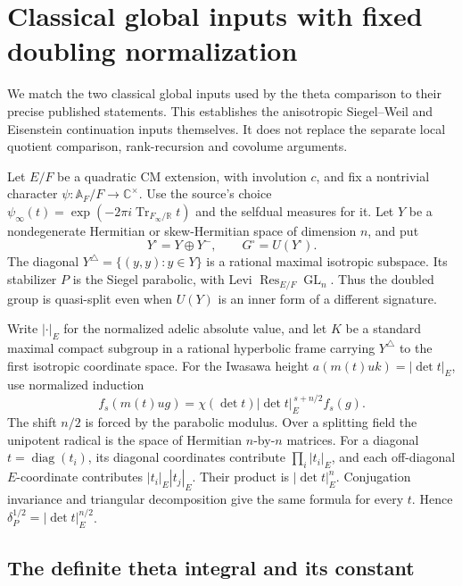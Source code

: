 \section{Classical global inputs with fixed doubling normalization}
\label{sec:sr-classical-doubling-inputs}

We match the two classical global inputs used by the theta
comparison to their precise published statements.
This establishes the anisotropic Siegel--Weil and Eisenstein
continuation inputs themselves.
It does not replace the separate local quotient comparison,
rank-recursion and covolume arguments.

Let \(E/F\) be a quadratic CM extension, with involution
\(c\), and fix a nontrivial character
\(\psi:\mathbb A_F/F\to\mathbb C^\times\).
Use the source's choice
\(\psi_\infty(t)=\exp(-2\pi i\operatorname{Tr}_{F_\infty/\mathbb R}t)\)
and the selfdual measures for it.
Let \(Y\) be a nondegenerate Hermitian or skew-Hermitian
space of dimension \(n\), and put
\[
             Y^\square=Y\oplus Y^{-},\qquad
             G^\square=U(Y^\square).
\]
The diagonal \(Y^\triangle=\{(y,y):y\in Y\}\) is a rational
maximal isotropic subspace.
Its stabilizer \(P\) is the Siegel parabolic, with Levi
\(\operatorname{Res}_{E/F}\operatorname{GL}_n\).
Thus the doubled group is quasi-split even when \(U(Y)\)
is an inner form of a different signature.

Write \(|\cdot|_E\) for the normalized adelic absolute value,
and let \(K\) be a standard maximal compact subgroup in
a rational hyperbolic frame carrying \(Y^\triangle\) to the
first isotropic coordinate space.
For the Iwasawa height
\(a(m(t)uk)=|\det t|_E\), use normalized induction
\begin{equation}\label{eq:sr-exact-induced-section}
 f_s(m(t)ug)
       =\chi(\det t)|\det t|_E^{\,s+n/2}f_s(g).
\end{equation}
The shift \(n/2\) is forced by the parabolic modulus.
Over a splitting field the unipotent radical is the space of
Hermitian \(n\)-by-\(n\) matrices.
For a diagonal \(t=\operatorname{diag}(t_i)\), its diagonal
coordinates contribute \(\prod_i|t_i|_E\), and each
off-diagonal \(E\)-coordinate contributes
\(|t_i|_E|t_j|_E\).
Their product is \(|\det t|_E^n\).
Conjugation invariance and triangular decomposition give the
same formula for every \(t\).
Hence \(\delta_P^{1/2}=|\det t|_E^{n/2}\).

\subsection{The definite theta integral and its constant}

